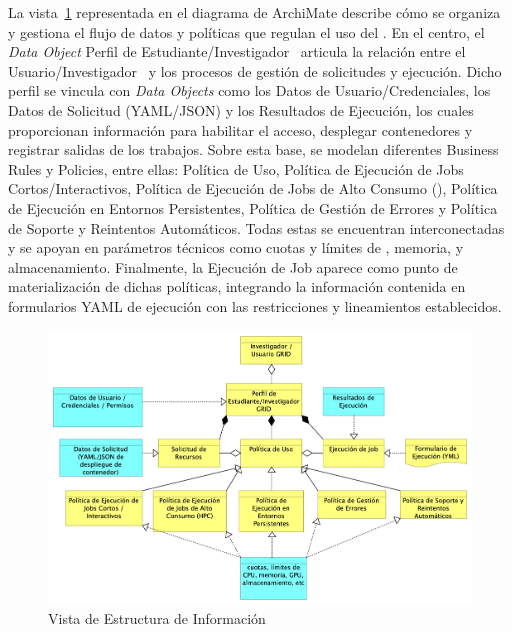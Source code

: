 La vista~\ref{fig:vista-informacion} representada en el diagrama de ArchiMate describe cómo se organiza y gestiona el flujo de datos y políticas que regulan el uso del \GRID. En el centro, el \textit{Data Object} Perfil de Estudiante/Investigador \GRID\ articula la relación entre el Usuario/Investigador \GRID\ y los procesos de gestión de solicitudes y ejecución. Dicho perfil se vincula con \textit{Data Objects} como los Datos de Usuario/Credenciales, los Datos de Solicitud (YAML/JSON) y los Resultados de Ejecución, los cuales proporcionan información para habilitar el acceso, desplegar contenedores y registrar salidas de los trabajos. Sobre esta base, se modelan diferentes Business Rules y Policies, entre ellas: Política de Uso, Política de Ejecución de Jobs Cortos/Interactivos, Política de Ejecución de Jobs de Alto Consumo (\HPC), Política de Ejecución en Entornos Persistentes, Política de Gestión de Errores y Política de Soporte y Reintentos Automáticos. Todas estas se encuentran interconectadas y se apoyan en parámetros técnicos como cuotas y límites de \CPU, memoria, \GPU y almacenamiento. Finalmente, la Ejecución de Job aparece como punto de materialización de dichas políticas, integrando la información contenida en formularios YAML de ejecución con las restricciones y lineamientos establecidos.
\begin{figure}[H]
    \centering
    \includegraphics[width=\textwidth]{tablas-images/cp6/Information-Structure-View.png}
    \caption{Vista de Estructura de Información}\label{fig:vista-informacion}
\end{figure}